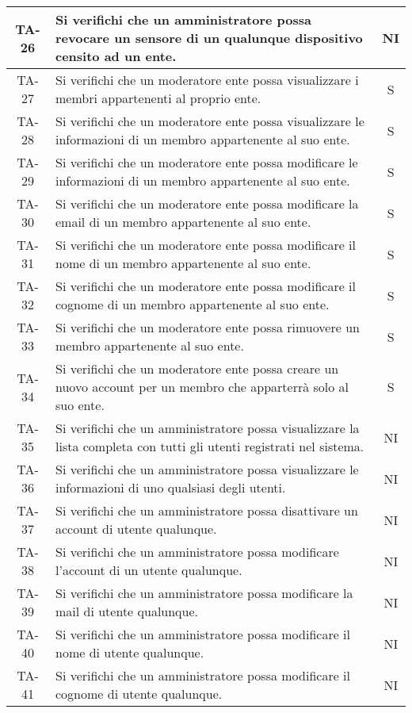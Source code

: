 \begin{center}
\begin{longtable}{|c|p{10cm}|c|}
			 \hline
			 TA-26 & Si verifichi che un amministratore possa revocare un sensore di un qualunque dispositivo censito ad un ente. & NI \\
			 \hline
			 TA-27 &  Si verifichi che un moderatore ente possa visualizzare i membri appartenenti al proprio ente. & S \\
			 \hline
			 TA-28 & Si verifichi che un moderatore ente possa visualizzare le informazioni di un membro appartenente al suo ente. & S \\
			 \hline
			 TA-29 & Si verifichi che un moderatore ente possa modificare le informazioni di un membro appartenente al suo ente. & S \\
			 \hline
			 TA-30 & Si verifichi che un moderatore ente possa modificare la email di un membro appartenente al suo ente. & S \\
			 \hline
			 TA-31 & Si verifichi che un moderatore ente possa modificare il nome di un membro appartenente al suo ente. & S \\
			 \hline
			 TA-32 & Si verifichi che un moderatore ente possa modificare il cognome di un membro appartenente al suo ente. & S \\
			 \hline
			 TA-33 & Si verifichi che un moderatore ente possa rimuovere un membro appartenente al suo ente. & S \\
			 \hline
			 TA-34 & Si verifichi che un moderatore ente possa creare un nuovo account per un membro che apparterrà solo al suo ente. & S \\
			 \hline
			 TA-35 & Si verifichi che un amministratore possa visualizzare la lista completa con tutti gli utenti registrati nel sistema. & NI \\
			 \hline
			 TA-36 & Si verifichi che un amministratore possa visualizzare le informazioni di uno qualsiasi degli utenti. & NI \\
			 \hline
			 TA-37 & Si verifichi che un amministratore possa disattivare un account di utente qualunque. & NI \\
			 \hline
			 TA-38 & Si verifichi che un amministratore possa modificare l'account di un utente qualunque. & NI \\
			 \hline
			 TA-39 & Si verifichi che un amministratore possa modificare la mail di utente qualunque. & NI \\
			 \hline
			 TA-40 & Si verifichi che un amministratore possa modificare il nome di utente qualunque. & NI \\
			 \hline
			 TA-41 & Si verifichi che un amministratore possa modificare il cognome di utente qualunque. & NI \\

\end{longtable}
\end{center}

